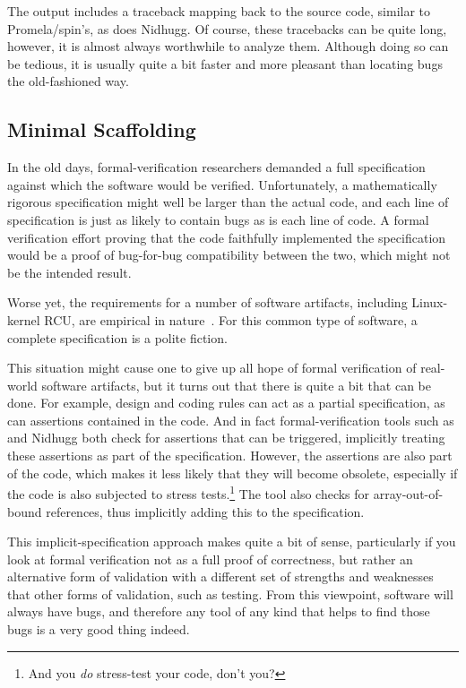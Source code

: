 The  output includes a traceback mapping back to the source
code, similar to Promela/spin's, as does Nidhugg.
Of course, these tracebacks can be quite long, however, it is almost
always worthwhile to analyze them.
Although doing so can be tedious, it is usually quite a bit faster
and more pleasant than locating bugs the old-fashioned way.

\subsection{Minimal Scaffolding}
\label{sec:formal:Minimal Scaffolding}

In the old days, formal-verification researchers demanded a full
specification against which the software would be verified.
Unfortunately, a mathematically rigorous specification might well
be larger than the actual code, and each line of specification
is just as likely to contain bugs as is each line of code.
A formal verification effort proving that the code faithfully
implemented the specification would be a proof of bug-for-bug
compatibility between the two, which might not be the intended
result.

Worse yet, the requirements for a number of software artifacts,
including Linux-kernel RCU, are empirical in
nature~\cite{PaulEMcKenney2015RCUreqts1,PaulEMcKenney2015RCUreqts2,PaulEMcKenney2015RCUreqts3}.
For this common type of software, a complete specification is a
polite fiction.

This situation might cause one to give up all hope of formal verification
of real-world software artifacts, but it turns out that there is
quite a bit that can be done.
For example, design and coding rules can act as a partial specification,
as can assertions contained in the code.
And in fact formal-verification tools such as  and Nidhugg
both check for assertions that can be triggered, implicitly treating
these assertions as part of the specification.
However, the assertions are also part of the code, which makes it less
likely that they will become obsolete, especially if the code is
also subjected to stress tests.\footnote{
	And you \emph{do} stress-test your code, don't you?}
The  tool also checks for array-out-of-bound references,
thus implicitly adding this to the specification.

This implicit-specification approach makes quite a bit of sense, particularly
if you look at formal verification not as a full proof of correctness,
but rather an alternative form of validation with a different set of
strengths and weaknesses that other forms of validation, such as testing.
From this viewpoint, software will always have bugs, and therefore any
tool of any kind that helps to find those bugs is a very good thing
indeed.

